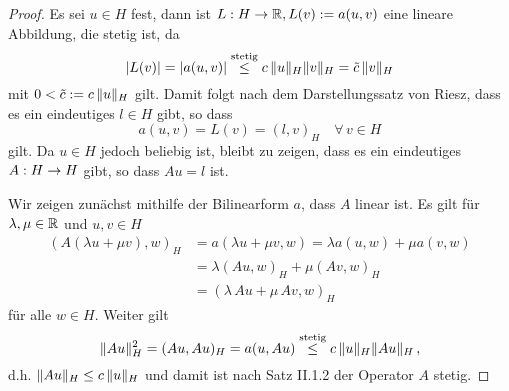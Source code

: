 \begin{itemize}
\begin{proof}
Es sei $u\in H$ fest, dann ist $L: H\rightarrow \mathbb{R}, L(v) := a(u,v)$ eine lineare Abbildung, die stetig ist, da
\[
	\lvert L(v)\rvert = \lvert a(u,v)\rvert \stackrel{\scriptsize\text{stetig}}\le c \,  \lVert u\rVert_H \lVert v\rVert_H  = \tilde c\, \lVert v\rVert_H
\]
mit $0<\tilde c := c \, \lVert u\rVert_H$ gilt. Damit folgt nach dem Darstellungssatz von Riesz, dass es ein eindeutiges $l \in H$ gibt, so dass
\[
	a(u,v) = L(v) = (l,v)_H \quad \forall \, v \in H
\]
gilt. Da $u \in H$ jedoch beliebig ist, bleibt zu zeigen, dass es ein eindeutiges $A:H\rightarrow H$ gibt, so dass $Au = l$ ist.

Wir zeigen zunächst mithilfe der Bilinearform $a$, dass $A$ linear ist. Es gilt für $\lambda,\mu \in \mathbb{R}$ und $u,v \in H$
\begin{align*}
	(A(\lambda u + \mu v),w)_H &= a(\lambda u + \mu v, w) = \lambda a(u,w) + \mu a(v,w) \\
	& = \lambda (Au,w)_H + \mu(Av,w)_H \\
	& = (\lambda \, Au+\mu \, Av,w)_H
\end{align*}
für alle $w \in H$. Weiter gilt
\[
	\lVert Au\rVert_H^2 = (Au,Au)_H = a(u,Au) \stackrel{\scriptsize \text{stetig}}\le c \, \lVert u\rVert_H \lVert Au\rVert_H \, ,
\]
d.h. $\lVert Au\rVert_H \le c \, \lVert u\rVert_H$ und damit ist nach \cite{Werner} Satz II.1.2 der Operator $A$ stetig.


\end{proof}
\end{itemize}
